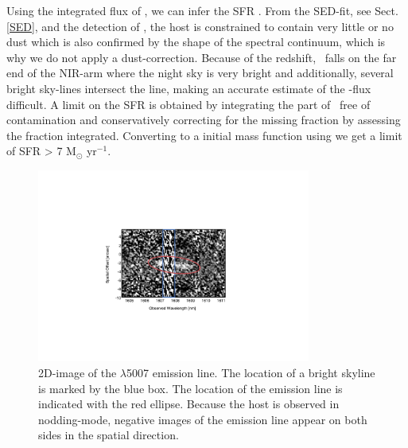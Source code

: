 \documentclass{aa}    %
\begin{document}

Using the integrated flux of \ha, we can infer the SFR \citep{Kennicutt1998, Moustakas2006}. From the SED-fit, see Sect. \ref{SED}, and the detection of \lya, the host is constrained to contain very little or no dust which is also confirmed by the shape of the spectral continuum, which is why we do not apply a dust-correction. Because of the redshift, \ha~falls on the far end of the NIR-arm where the night sky is very bright and additionally, several bright sky-lines intersect the line, making an accurate estimate of the \ha-flux difficult. %
A limit on the SFR is obtained by integrating the part of \ha~free of contamination and conservatively correcting for the missing fraction by assessing the fraction integrated. Converting to a \citet{Chabrier2003} initial mass function using \citet{Madau2014} we get a limit of SFR > 7 M$_\odot$ yr$^{-1}$. %

\begin{figure}
	\centering
	\includegraphics[width=9cm]{figures/OIII_img.pdf}
	\caption{2D-image of the \oiii$\lambda$5007 emission line. The location of a bright skyline is marked by the blue box. The location of the emission line is indicated with the red ellipse. Because the host is observed in nodding-mode, negative images of the emission line appear on both sides in the spatial direction.}
	\label{fig:line}
\end{figure}
\end{document}
